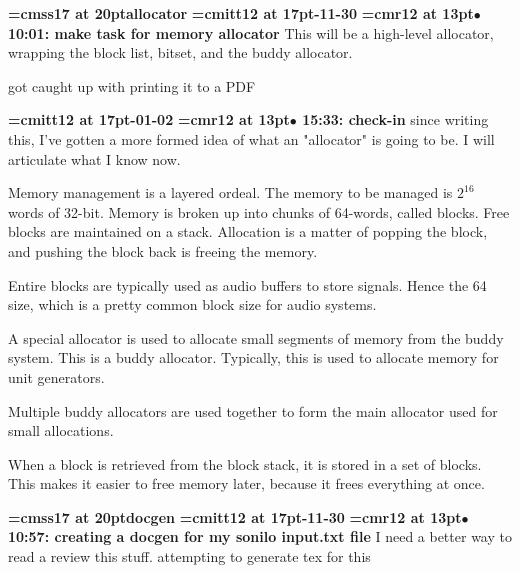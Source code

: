 {\medskip\noindent\bf\font\titlefont=cmss17 at 20pt\titlefont allocator}\medskip
{\medskip\noindent\bf\font\titlefont=cmitt12 at 17pt-11-30}\medskip
{\smallskip\noindent\bf\font\titlefont=cmr12 at 13pt\titlefont $\bullet$ 10:01: make task for memory allocator}\smallskip
This will be a high-level allocator, wrapping the block list, bitset, and the buddy allocator.
\par

got caught up with printing it to a PDF
\par

{\medskip\noindent\bf\font\titlefont=cmitt12 at 17pt-01-02}\medskip
{\smallskip\noindent\bf\font\titlefont=cmr12 at 13pt\titlefont $\bullet$ 15:33: check-in}\smallskip
since writing this, I've gotten a more formed idea of what an "allocator" is going to be. I will articulate what I know now.
\par

Memory management is a layered ordeal. The memory to be managed is $2^16$ words of 32-bit. Memory is broken up into chunks of 64-words, called blocks. Free blocks are maintained on a stack. Allocation is a matter of popping the block, and pushing the block back is freeing the memory.
\par

Entire blocks are typically used as audio buffers to store signals. Hence the 64 size, which is a pretty common block size for audio systems.
\par

A special allocator is used to allocate small segments of memory from the buddy system. This is a buddy allocator. Typically, this is used to allocate memory for unit generators.
\par

Multiple buddy allocators are used together to form the main allocator used for small allocations.
\par

When a block is retrieved from the block stack, it is stored in a set of blocks. This makes it easier to free memory later, because it frees everything at once.
\par

{\medskip\noindent\bf\font\titlefont=cmss17 at 20pt\titlefont docgen}\medskip
{\medskip\noindent\bf\font\titlefont=cmitt12 at 17pt-11-30}\medskip
{\smallskip\noindent\bf\font\titlefont=cmr12 at 13pt\titlefont $\bullet$ 10:57: creating a docgen for my sonilo input.txt file}\smallskip
I need a better way to read a review this stuff. attempting to generate tex for this
\par

